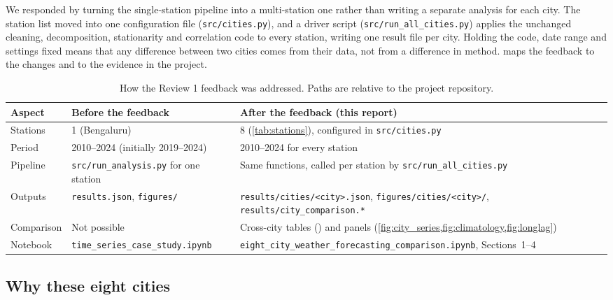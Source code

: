 \documentclass[11pt,a4paper]{article}
\newcommand{\code}[1]{\texttt{#1}}
\begin{document}
We responded by turning the single-station pipeline into a multi-station one rather than writing a separate analysis for each city. The station list moved into one configuration file (\code{src/cities.py}), and a driver script (\code{src/run\_all\_cities.py}) applies the unchanged cleaning, decomposition, stationarity and correlation code to every station, writing one result file per city. Holding the code, date range and settings fixed means that any difference between two cities comes from their data, not from a difference in method.  maps the feedback to the changes and to the evidence in the project.

\begin{table}[ht]
\centering
\small
\caption{How the Review 1 feedback was addressed. Paths are relative to the project repository.}
\label{tab:feedback}
\begin{tabularx}{\linewidth}{@{}>{\raggedright\arraybackslash}p{2.2cm}L L@{}}
\toprule
Aspect & Before the feedback & After the feedback (this report) \\
\midrule
Stations & 1 (Bengaluru) & 8 (\cref{tab:stations}), configured in \code{src/cities.py} \\
Period & 2010--2024 (initially 2019--2024) & 2010--2024 for every station \\
Pipeline & \code{src/run\_analysis.py} for one station & Same functions, called per station by \code{src/run\_all\_cities.py} \\
Outputs & \code{results.json}, \code{figures/} & \nolinkurl{results/cities/<city>.json}, \nolinkurl{figures/cities/<city>/}, \nolinkurl{results/city_comparison.*} \\
Comparison & Not possible & Cross-city tables () and panels (\cref{fig:city_series,fig:climatology,fig:longlag}) \\
Notebook & \code{time\_series\_case\_study.ipynb} & \nolinkurl{eight_city_weather_forecasting_comparison.ipynb}, Sections~1--4 \\
\bottomrule
\end{tabularx}
\end{table}

\subsection{Why these eight cities}
\end{document}
